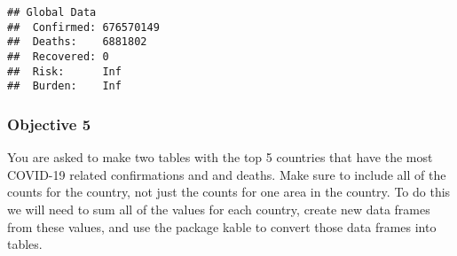 \documentclass[
]{article}
\newenvironment{Shaded}{\begin{snugshade}}{\end{snugshade}}
\newcommand{\FunctionTok}[1]{\textcolor[rgb]{0.00,0.00,0.00}{#1}}
\newcommand{\NormalTok}[1]{#1}
\newcommand{\OtherTok}[1]{\textcolor[rgb]{0.56,0.35,0.01}{#1}}
\newcommand{\SpecialCharTok}[1]{\textcolor[rgb]{0.00,0.00,0.00}{#1}}
\newcommand{\StringTok}[1]{\textcolor[rgb]{0.31,0.60,0.02}{#1}}
\begin{document}
\begin{Shaded}
\end{Shaded}

\begin{verbatim}
## Global Data
##  Confirmed: 676570149 
##  Deaths:    6881802 
##  Recovered: 0 
##  Risk:      Inf 
##  Burden:    Inf
\end{verbatim}

\hypertarget{objective-5}{%
\subsubsection{Objective 5}\label{objective-5}}

You are asked to make two tables with the top 5 countries that have the
most COVID-19 related confirmations and and deaths. Make sure to include
all of the counts for the country, not just the counts for one area in
the country. To do this we will need to sum all of the values for each
country, create new data frames from these values, and use the package
kable to convert those data frames into tables.
\end{document}
